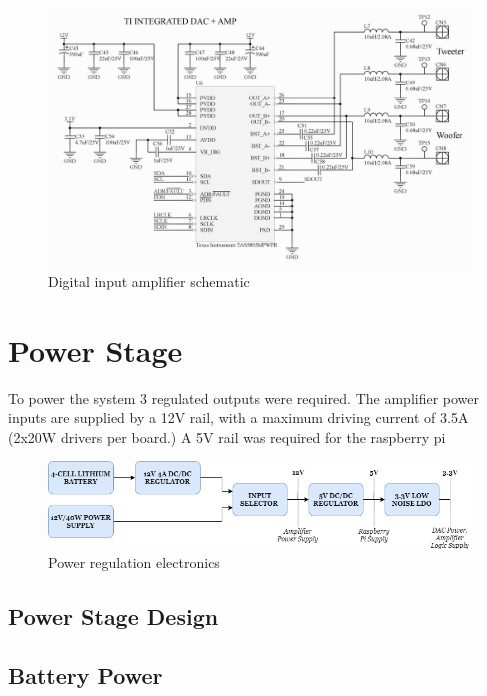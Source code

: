 \documentclass[main.tex]{subfiles}
\begin{document}
\begin{figure}[H]
    \centering
    \includegraphics[scale=0.75]{./figs/TAS-circuit.PNG}
    \caption{Digital input amplifier schematic}
    \label{fig:tas-circuit}
\end{figure}

\section{Power Stage}

To power the system 3 regulated outputs were required. The amplifier power inputs are supplied by a 12V rail, with a maximum driving current of \approx 3.5A (2x20W drivers per board.) A 5V rail was required for the raspberry pi

\begin{figure}[H]
    \centering
    \includegraphics[scale=0.6]{./figs/power-system.png}
    \caption{Power regulation electronics}
    \label{fig:power-system}
\end{figure}


\subsection{Power Stage Design}

\subsection{Battery Power}
\end{document}
